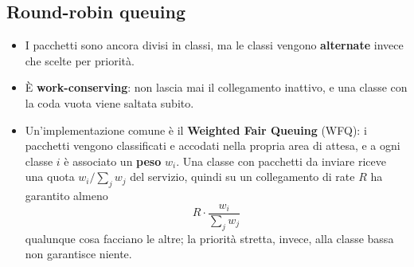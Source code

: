\subsection{Round-robin queuing}

\begin{itemize}
    \item I pacchetti sono ancora divisi in classi, ma le classi vengono \textbf{alternate} invece che scelte per priorità.
    \item È \textbf{work-conserving}: non lascia mai il collegamento inattivo, e una classe con la coda vuota viene saltata
          subito.
    \item Un'implementazione comune è il \textbf{Weighted Fair Queuing} (WFQ): i pacchetti vengono classificati e accodati
          nella propria area di attesa, e a ogni classe $i$ è associato un \textbf{peso} $w_i$. Una classe con pacchetti da
          inviare riceve una quota $w_i / \sum_j w_j$ del servizio, quindi su un collegamento di rate $R$ ha garantito almeno
          \[ R \cdot \frac{w_i}{\sum_j w_j} \]
          qualunque cosa facciano le altre; la priorità stretta, invece, alla classe bassa non garantisce niente.
\end{itemize}

